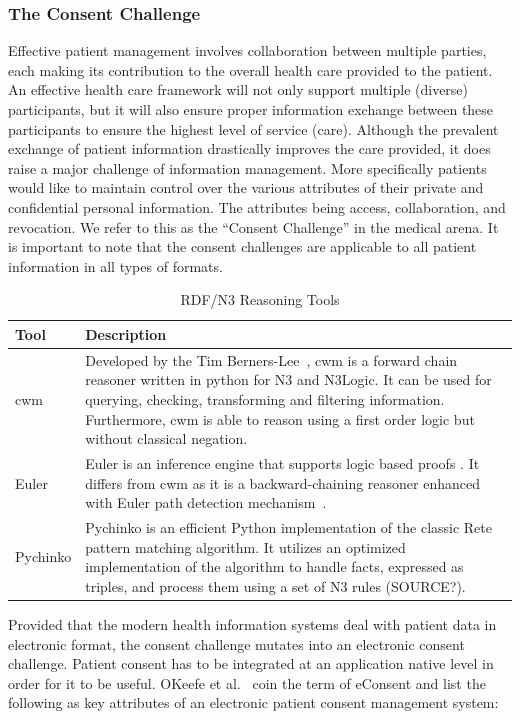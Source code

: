 \documentclass[conference]{IEEEtran}
\begin{document}
\subsubsection*{The Consent Challenge}
Effective patient management involves collaboration between multiple parties, each making its contribution to the overall health care provided to the patient. 
An effective health care framework will not only support multiple (diverse) participants, but it will also ensure proper information exchange between these
participants to ensure the highest level of service (care).  Although the prevalent exchange of patient information drastically improves the care provided, it
does raise a major challenge of information management.  More specifically patients would like to maintain control over the various attributes of their private
and confidential personal information.  The attributes being access, collaboration, and revocation.  We refer to this as the “Consent Challenge” in the medical
arena.  It is important to note that the consent challenges are applicable to all patient information in all types of formats.  

\begin{table}[!t]
\centering
 \begin{tabular}{m{1cm}|m{9cm}}
\textbf{Tool} & \textbf{Description}\\
\hline\hline
cwm & Developed by the Tim Berners-Lee~\cite{berners-lee2008}, cwm is a forward chain reasoner written in python for N3 and N3Logic.  It can be used for
querying, checking, transforming and filtering information.  Furthermore, cwm is able to reason using a first order logic but without classical negation.\\
\hline
Euler & Euler is an inference engine that supports logic based proofs .  It differs from cwm as it is a backward-chaining reasoner enhanced with Euler path
detection mechanism~\cite{naudts2003inference}.\\
\hline
Pychinko & Pychinko is an efficient Python implementation of the classic Rete pattern matching algorithm.  It utilizes an optimized implementation of the
algorithm to handle facts, expressed as triples, and process them using a set of N3 rules (SOURCE?).\\
 \end{tabular}
\label{tab:n3tools}
\caption{RDF/N3 Reasoning Tools}
\end{table}

Provided that the modern health information systems deal with patient data in electronic format, the consent challenge mutates into an electronic consent
challenge.  Patient consent has to be integrated at an application native level in order for it to be useful. OKeefe et al.~\cite{okeefe2002implementation}
coin the term of eConsent and list the following as key attributes of an electronic patient consent management system:
\end{document}
